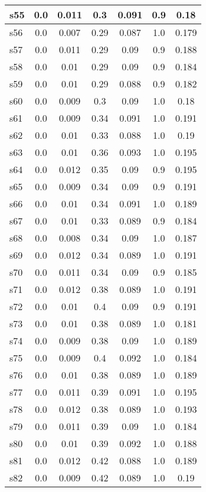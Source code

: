 \documentclass{article}
\begin{document}
\begin{tabular}{|l|c|c|c|c|c|c|}
\hline
s55 &0.0 & 0.011 & 0.3 & 0.091 & 0.9 & 0.18\\
\hline
s56 &0.0 & 0.007 & 0.29 & 0.087 & 1.0 & 0.179\\
\hline
s57 &0.0 & 0.011 & 0.29 & 0.09 & 0.9 & 0.188\\
\hline
s58 &0.0 & 0.01 & 0.29 & 0.09 & 0.9 & 0.184\\
\hline
s59 &0.0 & 0.01 & 0.29 & 0.088 & 0.9 & 0.182\\
\hline
s60 &0.0 & 0.009 & 0.3 & 0.09 & 1.0 & 0.18\\
\hline
s61 &0.0 & 0.009 & 0.34 & 0.091 & 1.0 & 0.191\\
\hline
s62 &0.0 & 0.01 & 0.33 & 0.088 & 1.0 & 0.19\\
\hline
s63 &0.0 & 0.01 & 0.36 & 0.093 & 1.0 & 0.195\\
\hline
s64 &0.0 & 0.012 & 0.35 & 0.09 & 0.9 & 0.195\\
\hline
s65 &0.0 & 0.009 & 0.34 & 0.09 & 0.9 & 0.191\\
\hline
s66 &0.0 & 0.01 & 0.34 & 0.091 & 1.0 & 0.189\\
\hline
s67 &0.0 & 0.01 & 0.33 & 0.089 & 0.9 & 0.184\\
\hline
s68 &0.0 & 0.008 & 0.34 & 0.09 & 1.0 & 0.187\\
\hline
s69 &0.0 & 0.012 & 0.34 & 0.089 & 1.0 & 0.191\\
\hline
s70 &0.0 & 0.011 & 0.34 & 0.09 & 0.9 & 0.185\\
\hline
s71 &0.0 & 0.012 & 0.38 & 0.089 & 1.0 & 0.191\\
\hline
s72 &0.0 & 0.01 & 0.4 & 0.09 & 0.9 & 0.191\\
\hline
s73 &0.0 & 0.01 & 0.38 & 0.089 & 1.0 & 0.181\\
\hline
s74 &0.0 & 0.009 & 0.38 & 0.09 & 1.0 & 0.189\\
\hline
s75 &0.0 & 0.009 & 0.4 & 0.092 & 1.0 & 0.184\\
\hline
s76 &0.0 & 0.01 & 0.38 & 0.089 & 1.0 & 0.189\\
\hline
s77 &0.0 & 0.011 & 0.39 & 0.091 & 1.0 & 0.195\\
\hline
s78 &0.0 & 0.012 & 0.38 & 0.089 & 1.0 & 0.193\\
\hline
s79 &0.0 & 0.011 & 0.39 & 0.09 & 1.0 & 0.184\\
\hline
s80 &0.0 & 0.01 & 0.39 & 0.092 & 1.0 & 0.188\\
\hline
s81 &0.0 & 0.012 & 0.42 & 0.088 & 1.0 & 0.189\\
\hline
s82 &0.0 & 0.009 & 0.42 & 0.089 & 1.0 & 0.19\\

\end{tabular}
\end{document}
